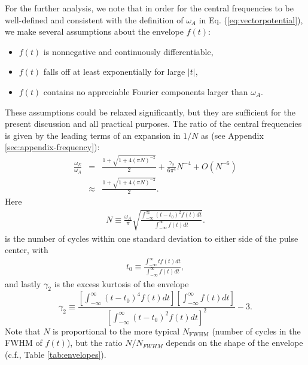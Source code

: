 For the further analysis, we note that in order for the central frequencies to be well-defined and consistent with the definition of $\omega_A$ in Eq. (\ref{eq:vectorpotential}), we make several assumptions about the envelope $f(t)$:
\begin{itemize}
  \item $f(t)$ is nonnegative and continuously differentiable,
  \item $f(t)$ falls off at least exponentially for large $|t|$, 
\item $f(t)$ contains no appreciable Fourier components larger than $\omega_A$.
\end{itemize}
These assumptions could be relaxed significantly, but they are sufficient for the present discussion and all practical purposes. The ratio of the central frequencies is given by the leading terms of an expansion in $1/N$ as (see Appendix \ref{sec:appendix-frequency}):
\begin{eqnarray}
\label{eq:fshift}
\frac{\omega_E}{\omega_A} 
&=& 
\frac{1+\sqrt{1+4(\pi N)^{-2}}}{2}+ \frac{\gamma_2}{6\pi^4} N^{-4} + O( N^{-6})
\\
\label{eq:fshiftapprox}
&\approx& 
\frac{1+\sqrt{1+4(\pi N)^{-2}}}{2}.
\end{eqnarray}
%
Here
%
\begin{equation}
\begin{split}
\label{eq:nbar}
 N \equiv \frac{\omega_A}{\pi} \sqrt{\frac{\int_{-\infty}^{\infty} (t-t_0)^2 f(t) dt}{\int_{-\infty}^{\infty} f(t) dt}}.
\end{split}
\end{equation}
%
is the number of cycles within one standard deviation to either side of the pulse center, with
%
\begin{equation}
\begin{split}
t_0 \equiv \frac{\int_{-\infty}^{\infty} t f(t) dt}{\int_{-\infty}^{\infty} f(t) dt},
\end{split}
\end{equation}
%
and lastly $\gamma_2$ is the excess kurtosis of the envelope
%
\begin{equation}
\label{eq:gamma2}
\gamma_2 \equiv \frac{\left[\int_{-\infty}^{\infty} (t-t_0)^4 f(t) dt\right]\left[\int_{-\infty}^{\infty} f(t) dt\right]}{\left[\int_{-\infty}^{\infty} (t-t_0)^2 f(t) dt\right]^2}-3.
\end{equation}
%
Note that $N$ is proportional to the more typical $N_{\text{FWHM}}$ (number of cycles in the FWHM of $f(t)$), but the ratio $N/N_{FWHM}$ depends on the shape of the envelope (c.f., Table \ref{tab:envelopes}). 

